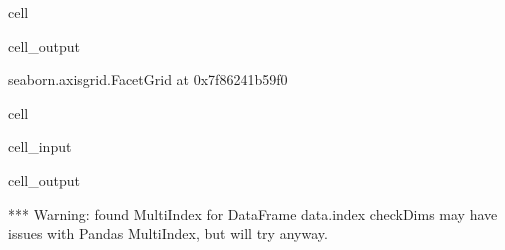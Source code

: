 \documentclass[letterpaper,table,10pt,english]{jupyterBook}
\begin{document}
\begin{sphinxuseclass}{cell}
\begin{sphinxVerbatimOutput}
\begin{sphinxuseclass}{cell_output}
\begin{sphinxVerbatim}[commandchars=\\\{\}]
\PYGZlt{}seaborn.axisgrid.FacetGrid at 0x7f86241b59f0\PYGZgt{}
\end{sphinxVerbatim}

\noindent{}

\end{sphinxuseclass}\end{sphinxVerbatimOutput}

\end{sphinxuseclass}
\begin{sphinxuseclass}{cell}\begin{sphinxVerbatimInput}

\begin{sphinxuseclass}{cell_input}
\begin{sphinxVerbatim}[commandchars=\\\{\}]
   
       
                      
\end{sphinxVerbatim}

\end{sphinxuseclass}\end{sphinxVerbatimInput}
\begin{sphinxVerbatimOutput}

\begin{sphinxuseclass}{cell_output}
\begin{sphinxVerbatim}[commandchars=\\\{\}]
*** Warning: found MultiIndex for DataFrame data.index \PYGZhy{} checkDims may have issues with Pandas MultiIndex, but will try anyway.
\end{sphinxVerbatim}


\end{sphinxuseclass}
\end{sphinxVerbatimOutput}
\end{sphinxuseclass}
\end{document}
